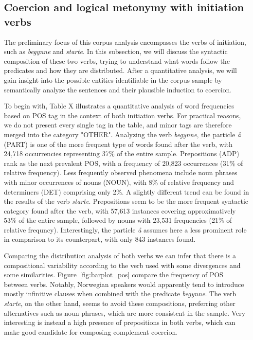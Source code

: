 \documentclass{article}
\begin{document}



\subsection{Coercion and logical metonymy with initiation verbs}
The preliminary focus of this corpus analysis encompasses the verbs of initiation, such as \emph{begynne} and \emph{starte}. In this subsection, we will discuss the syntactic composition of these two verbs, trying to understand what words follow the predicates and how they are distributed. After a quantitative analysis, we will gain insight into the possible entities identifiable in the corpus sample by semantically analyze the sentences and their plausible induction to coercion.

To begin with, Table X illustrates a quantitative analysis of word frequencies based on POS tag in the context of both initiation verbs. For practical reasons, we do not present every single tag in the table, and minor tags are therefore merged into the category "OTHER". Analyzing  the verb \emph{begynne}, the particle \emph{å} (PART) is one of the more frequent type of words found after the verb, with 24,718 occurrencies representing 37\% of the entire sample. Prepositions (ADP) rank as the next prevalent POS, with a frequency of 20,823 occurrences (31\% of relative frequency). Less frequently observed phenomena include noun phrases with minor occurrences of nouns (NOUN), with 8\% of relative frequency and determiners (DET) comprising only 2\%. 
A slightly different trend can be found in the results of the verb \emph{starte}. Prepositions seem to be the more frequent syntactic category found after the verb, with 57,613 instances covering approximatively 53\% of the entire sample, followed by nouns with 23,531 frequencies (21\% of relative frequncy). Interestingly, the particle \emph{å} assumes here a less prominent role in comparison to its counterpart, with only 843 instances found.

Comparing the distribution analysis of both verbs we can infer that there is a compositional variability according to the verb used with some divergences and some similarities. Figure~\ref{fig:barplot_pos} compare the frequency of POS between verbs. Notably, Norwegian speakers would apparently tend to introduce mostly infinitive clauses when combined with the predicate \emph{begynne}. The verb \emph{starte}, on the other hand, seems to avoid these compositions, preferring other alternatives such as noun phrases, which are more consistent in the sample. Very interesting is instead a high presence of prepositions in both verbs, which can make good candidate for composing complement coercion. 
\end{document}

